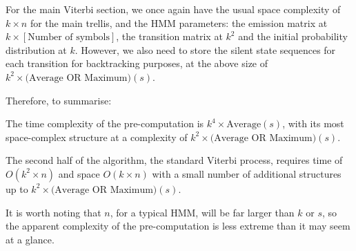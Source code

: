 \documentclass[11pt]{article} %
\begin{document}
For the main Viterbi section, we once again have the usual space complexity of $k \times n$ for the main trellis, and the HMM parameters: the emission matrix at $k \times [\text{Number of symbols}]$, the transition matrix at $k^2$ and the initial probability distribution at $k$. However, we also need to store the silent state sequences for each transition for backtracking purposes, at the above size of $k^2 \times \text{(Average OR Maximum)}(s)$.

\hfill

Therefore, to summarise:

The time complexity of the pre-computation is $k^4 \times \text{Average}(s)$, with its most space-complex structure at a complexity of $k^2 \times \text{(Average OR Maximum)}(s)$.

The second half of the algorithm, the standard Viterbi process, requires time of $O(k^2 \times n)$ and space $O(k \times n)$ with a small number of additional structures up to $k^2 \times \text{(Average OR Maximum)}(s)$.

It is worth noting that $n$, for a typical HMM, will be far larger than $k$ or $s$, so the apparent complexity of the pre-computation is less extreme than it may seem at a glance.
\end{document}
